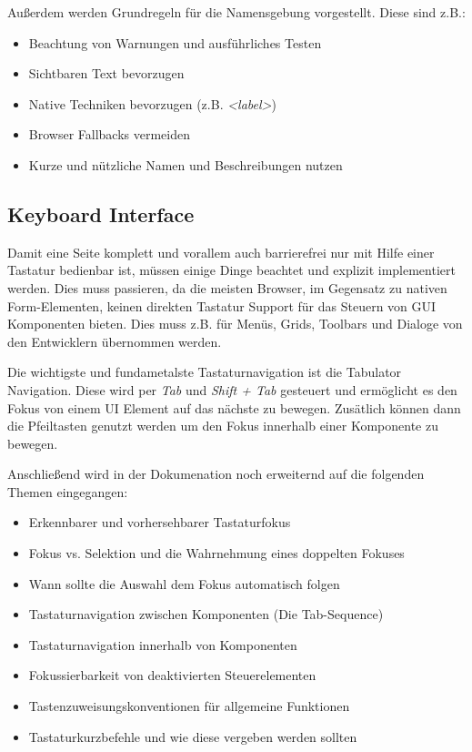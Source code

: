 Außerdem werden Grundregeln für die Namensgebung vorgestellt. Diese sind z.B.:

\begin{itemize}
    \item Beachtung von Warnungen und ausführliches Testen
    \item Sichtbaren Text bevorzugen
    \item Native Techniken bevorzugen (z.B. \emph{<label>})
    \item Browser Fallbacks vermeiden
    \item Kurze und nützliche Namen und Beschreibungen nutzen
\end{itemize}

\subsection{Keyboard Interface}

Damit eine Seite komplett und vorallem auch barrierefrei nur mit Hilfe einer Tastatur bedienbar ist, müssen einige Dinge beachtet und explizit implementiert werden. Dies muss passieren, da die meisten Browser, im Gegensatz zu nativen Form-Elementen, keinen direkten Tastatur Support für das Steuern von GUI Komponenten bieten. \cite{initiative_wai_developing_nodate} Dies muss z.B. für Menüs, Grids, Toolbars und Dialoge von den Entwicklern übernommen werden.

Die wichtigste und fundametalste Tastaturnavigation ist die Tabulator Navigation. Diese wird per \emph{Tab} und \emph{Shift + Tab} gesteuert und ermöglicht es den Fokus von einem UI Element auf das nächste zu bewegen. Zusätlich können dann die Pfeiltasten genutzt werden um den Fokus innerhalb einer Komponente zu bewegen. \cite{initiative_wai_developing_nodate}

Anschließend wird in der Dokumenation noch erweiternd auf die folgenden Themen eingegangen:

\begin{itemize}
    \item Erkennbarer und vorhersehbarer Tastaturfokus
    \item Fokus vs. Selektion und die Wahrnehmung eines doppelten Fokuses
    \item Wann sollte die Auswahl dem Fokus automatisch folgen
    \item Tastaturnavigation zwischen Komponenten (Die Tab-Sequence)
    \item Tastaturnavigation innerhalb von Komponenten
    \item Fokussierbarkeit von deaktivierten Steuerelementen
    \item Tastenzuweisungskonventionen für allgemeine Funktionen
    \item Tastaturkurzbefehle und wie diese vergeben werden sollten
\end{itemize}

